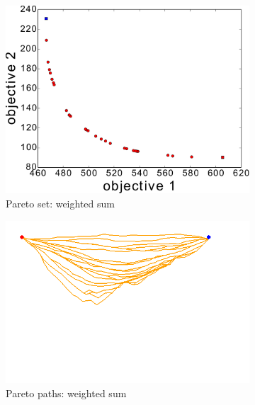 \documentclass{article}
\begin{document}
\begin{figure}
\begin{subfigure}[b]{0.45\linewidth}
		\includegraphics[width=\textwidth]{fig/sim1-2obj/PF01-MORRT.pdf}
		\caption{Pareto set: weighted sum}
		\label{fig:sim:norm:pf:b}
	\end{subfigure}
	\begin{subfigure}[b]{0.45\linewidth}
		\centering
		\includegraphics[width=\textwidth]{fig/sim1-2obj/MORRTstar00-ALL.png}
		\caption{Pareto paths: weighted sum}
		\label{fig:sim:norm:sols:b}
	\end{subfigure}  \\
	\begin{subfigure}[b]{0.45\linewidth}
		\centering

\end{subfigure}
\end{figure}
\end{document}
